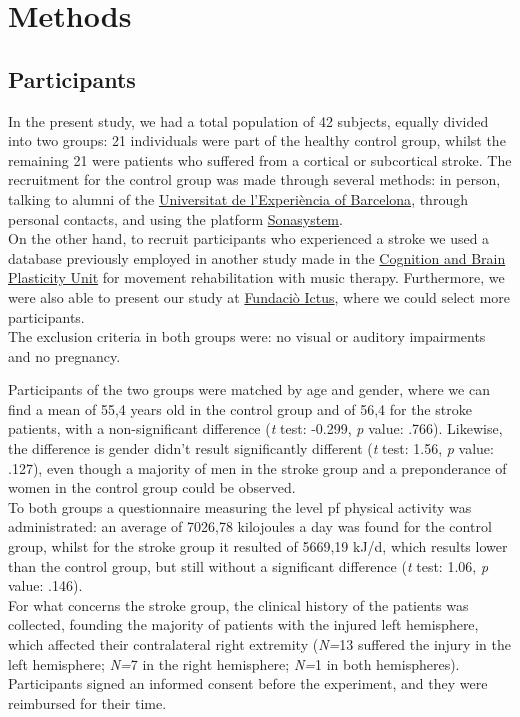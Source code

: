 \chapter{Methods}
\section{Participants}
In the present study, we had a total population of 42 subjects, equally divided into two groups: 21 individuals were part of the healthy control group, whilst the remaining 21 were patients who suffered from a cortical or subcortical stroke. The recruitment for the control group was made through several methods: in person, talking to alumni of the \href{https://www.experiencia.ub.edu/ca/}{Universitat de l'Experiència of Barcelona}, through personal contacts, and using the platform \href{https://www.sona-systems.com/}{Sonasystem}. \\
On the other hand, to recruit participants who experienced a stroke we used a database previously employed in another study made in the \href{https://brainvitge.org/}{Cognition and Brain Plasticity Unit} for movement rehabilitation with music therapy. Furthermore, we were also able to present our study at \href{https://www.fundacioictus.com/}{Fundaciò Ictus}, where we could select more participants. \\ 
The exclusion criteria in both groups were: no visual or auditory impairments and no pregnancy.

Participants of the two groups were matched by age and gender, where we can find a mean of 55,4 years old in the control group and of 56,4 for the stroke patients, with a non-significant difference (\textit{t} test: -0.299, \textit{p} value: .766). Likewise, the difference is gender didn't result significantly different (\textit{t} test: 1.56, \textit{p} value: .127), even though a majority of men in the stroke group and a preponderance of women in the control group could be observed. \\ To both groups a questionnaire measuring the level pf physical activity was administrated: an average of 7026,78 kilojoules a day was found for the control group, whilst for the stroke group it resulted of 5669,19 kJ/d, which results lower than the control group, but still without a significant difference (\textit{t} test: 1.06, \textit{p} value: .146). \\
For what concerns the stroke group, the clinical history of the patients was collected, founding the majority of patients with the injured left hemisphere, which affected their contralateral right extremity (\textit{N=}13 suffered the injury in the left hemisphere; \textit{N=}7 in the right hemisphere; \textit{N=}1 in both hemispheres).\\ 
Participants signed an informed consent before the experiment, and they were reimbursed for their time. 

